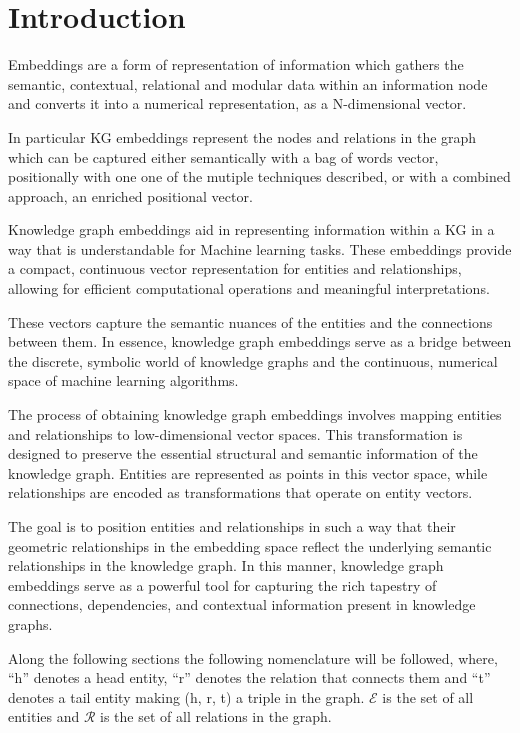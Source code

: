 \section{Introduction}\label{sec:emb-intro}
Embeddings are a form of representation of information which gathers the semantic, contextual, relational and modular data within an information node and converts it into a numerical representation, as a N-dimensional vector.

In particular KG embeddings represent the nodes and relations in the graph which can be captured either semantically with a bag of words vector, positionally with one one of the mutiple techniques described, or with a combined approach, an enriched positional vector.

Knowledge graph embeddings aid in representing information within a KG in a way that is understandable for Machine learning tasks. These embeddings provide a compact, continuous vector representation for entities and relationships, allowing for efficient computational operations and meaningful interpretations.

These vectors capture the semantic nuances of the entities and the connections between them. In essence, knowledge graph embeddings serve as a bridge between the discrete, symbolic world of knowledge graphs and the continuous, numerical space of machine learning algorithms.

The process of obtaining knowledge graph embeddings involves mapping entities and relationships to low-dimensional vector spaces. This transformation is designed to preserve the essential structural and semantic information of the knowledge graph. Entities are represented as points in this vector space, while relationships are encoded as transformations that operate on entity vectors.

The goal is to position entities and relationships in such a way that their geometric relationships in the embedding space reflect the underlying semantic relationships in the knowledge graph. In this manner, knowledge graph embeddings serve as a powerful tool for capturing the rich tapestry of connections, dependencies, and contextual information present in knowledge graphs.

Along the following sections the following nomenclature will be followed, where, ``h'' denotes a head entity, ``r'' denotes the relation that connects them and ``t'' denotes a tail entity making (h, r, t) a triple in the graph. $\mathcal{E}$ is the set of all entities and $\mathcal{R}$ is the set of all relations in the graph.


